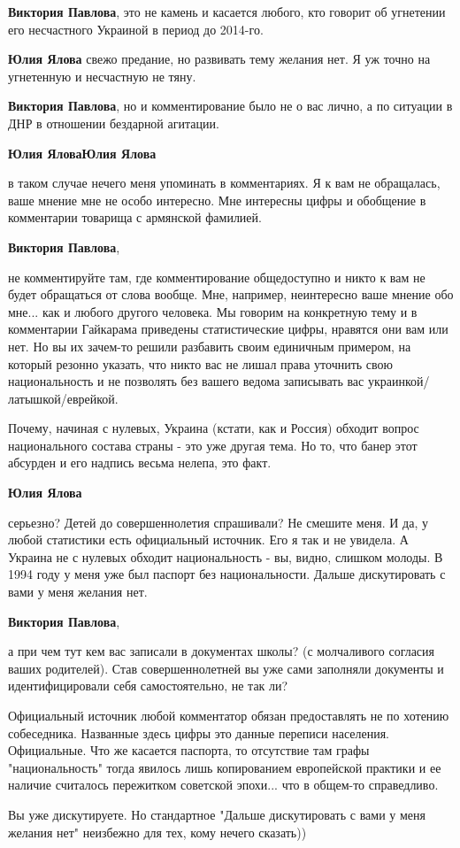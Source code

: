 \begin{itemize}
\begin{itemize}
\textbf{Виктория Павлова}, это не камень и касается любого, кто говорит об угнетении его несчастного Украиной в период до 2014-го.

\textbf{Юлия Ялова} свежо предание, но развивать тему желания нет. Я уж точно на угнетенную и несчастную не тяну.

\textbf{Виктория Павлова}, но и комментирование было не о вас лично, а по ситуации в ДНР в отношении бездарной агитации.

\textbf{Юлия Ялова}\textbf{Юлия Ялова} 

в таком случае нечего меня упоминать в комментариях. Я к вам не обращалась,
ваше мнение мне не особо интересно. Мне интересны цифры и обобщение в
комментарии товарища с армянской фамилией.


\textbf{Виктория Павлова}, 

не комментируйте там, где комментирование общедоступно и никто к вам не будет
обращаться от слова вообще. Мне, например, неинтересно ваше мнение обо мне...
как и любого другого человека. Мы говорим на конкретную тему и в комментарии
Гайкарама приведены статистические цифры, нравятся они вам или нет. Но вы их
зачем-то решили разбавить своим единичным примером, на который резонно указать,
что никто вас не лишал права уточнить свою национальность и не позволять без
вашего ведома записывать вас украинкой/латышкой/еврейкой.

Почему, начиная с нулевых, Украина (кстати, как и Россия) обходит вопрос
национального состава страны - это уже другая тема. Но то, что банер этот
абсурден и его надпись весьма нелепа, это факт.

\textbf{Юлия Ялова} 

серьезно? Детей до совершеннолетия спрашивали? Не смешите меня. И да, у любой
статистики есть официальный источник. Его я так и не увидела. А Украина не с
нулевых обходит национальность - вы, видно, слишком молоды. В 1994 году у меня
уже был паспорт без национальности. Дальше дискутировать с вами у меня желания
нет.


\textbf{Виктория Павлова}, 

а при чем тут кем вас записали в документах школы? (с молчаливого согласия
ваших родителей). Став совершеннолетней вы уже сами заполняли документы и
идентифицировали себя самостоятельно, не так ли?

Официальный источник любой комментатор обязан предоставлять не по хотению
собеседника. Названные здесь цифры это данные переписи населения. Официальные.
Что же касается паспорта, то отсутствие там графы "национальность" тогда
явилось лишь копированием европейской практики и ее наличие считалось
пережитком советской эпохи... что в общем-то справедливо.

Вы уже дискутируете. Но стандартное "Дальше дискутировать с вами у меня желания
нет" неизбежно для тех, кому нечего сказать))

\end{itemize} %

\end{itemize} %
